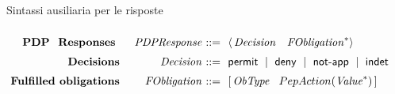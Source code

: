 \begin{table}[!t]
\small
\caption{Sintassi ausiliaria per le risposte}
$
\begin{array}{@{\ }r@{\ \ \ \ }r@{\ }r@{\ \ }l@{\ }}

&&&\\[-.2cm]
{\textbf{PDP \ Responses }} &
\mathit{PDPResponse} & ::= & \langle \,\mathit{Decision} \ \ \ \mathit{FObligation}^* \rangle
\\[.2cm]
{\textbf{Decisions}} &
\mathit{Decision} & ::= & \permit \Sep \deny \Sep \notApp \Sep \indet
\\[.2cm]
{\textbf{Fulfilled obligations}} &
\mathit{FObligation} & ::= &  [ \, \mathit{ObType} \ \ \obl{\mathit{Value}} \, ]\\[.1cm]

\end{array}
$
\label{tab:facpl_context_syntax}
\end{table}
